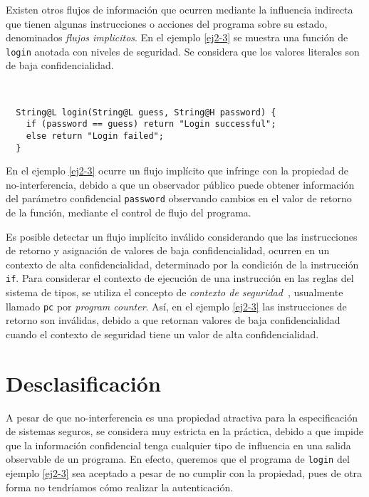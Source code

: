 Existen otros flujos de información que ocurren mediante la influencia indirecta que tienen algunas instrucciones o acciones del programa sobre su estado, denominados \emph{flujos implicitos}. En el ejemplo \ref{ej2-3} se muestra una función de \texttt{login} anotada con niveles de seguridad. Se considera que los valores literales son de baja confidencialidad.

\begin{ej} \ \\
  \normalfont
  \label{ej2-3}
\begin{lstlisting}
  String@L login(String@L guess, String@H password) {
    if (password == guess) return "Login successful";
    else return "Login failed";
  }
\end{lstlisting}
\end{ej}

En el ejemplo \ref{ej2-3} ocurre un flujo implícito que infringe con la propiedad de no-interferencia, debido a que un observador público puede obtener información del parámetro confidencial \texttt{password} observando cambios en el valor de retorno de la función, mediante el control de flujo del programa.

Es posible detectar un flujo implícito inválido considerando que las instrucciones de retorno y asignación de valores de baja confidencialidad, ocurren en un contexto de alta confidencialidad, determinado por la condición de la instrucción \texttt{if}. Para considerar el contexto de ejecución de una instrucción en las reglas del sistema de tipos, se utiliza el concepto de \emph{contexto de seguridad}~\cite{pc}, usualmente llamado \texttt{pc} por \emph{program counter}. Así, en el ejemplo \ref{ej2-3} las instrucciones de retorno son inválidas, debido a que retornan valores de baja confidencialidad cuando el contexto de seguridad tiene un valor de alta confidencialidad.

\section{Desclasificación}
A pesar de que no-interferencia es una propiedad atractiva para la especificación de sistemas seguros, se considera muy estricta en la práctica, debido a que impide que la información confidencial tenga cualquier tipo de influencia en una salida observable de un programa. En efecto, queremos que el programa de \texttt{login} del ejemplo \ref{ej2-3} sea aceptado a pesar de no cumplir con la propiedad, pues de otra forma no tendríamos cómo realizar la autenticación.


